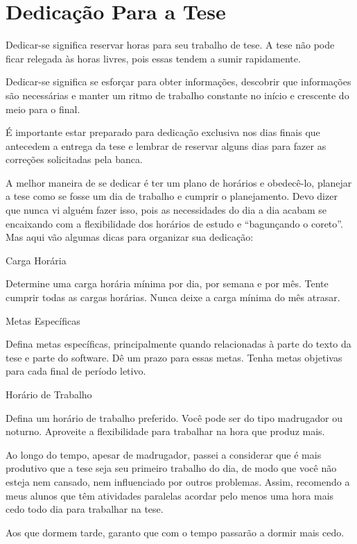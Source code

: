 \chapter{Dedicação Para a Tese}




Dedicar-se significa reservar horas para seu trabalho de tese. A tese não pode ficar relegada às horas livres, pois essas tendem a sumir rapidamente. 


Dedicar-se significa se esforçar para obter informações, descobrir que informações são necessárias e manter um ritmo de trabalho constante no início e crescente do meio para o final. 


É importante estar preparado para dedicação exclusiva nos dias finais que antecedem a entrega da tese e lembrar de reservar alguns dias para fazer as correções solicitadas pela banca.


A melhor maneira de se dedicar é ter um plano de horários e obedecê-lo, planejar a tese como se fosse um dia de trabalho e cumprir o planejamento. Devo dizer que nunca vi alguém fazer isso, pois as necessidades do dia a dia acabam se encaixando com a flexibilidade dos horários de estudo e “bagunçando o coreto”. Mas aqui vão algumas dicas para organizar sua dedicação:

\begin{outline}
\1	Carga Horária


\2	Determine uma carga horária mínima por dia, por semana e por mês. Tente cumprir todas as cargas horárias. Nunca deixe a carga mínima do mês atrasar.


\1	Metas Específicas


\2	Defina metas específicas, principalmente quando relacionadas à parte do texto da tese e parte do software. Dê um prazo para essas metas. Tenha metas objetivas para cada final de período letivo.


\1	Horário de Trabalho


\2	Defina um horário de trabalho preferido. Você pode ser do tipo madrugador ou noturno. Aproveite a flexibilidade para trabalhar na hora que produz mais. 


\3	Ao longo do tempo, apesar de madrugador, passei a considerar que é mais produtivo que a tese seja seu primeiro trabalho do dia, de modo que você não esteja nem cansado, nem influenciado por outros problemas. Assim, recomendo a meus alunos que têm atividades paralelas acordar pelo menos uma hora mais cedo todo dia para trabalhar na tese.


\1	Aos que dormem tarde, garanto que com o tempo passarão a dormir mais cedo.
\end{outline}

